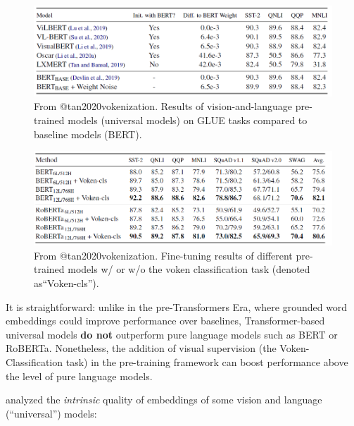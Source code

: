 \documentclass[
]{krantz}
\begin{document}
\begin{figure}

{\centering \includegraphics[width=1\linewidth]{figures/02-03-img-support-text/img-tan2020-02} 

}

\caption{From @tan2020vokenization. Results of vision-and-language pre-trained models (universal models) on GLUE tasks compared to baseline models (BERT).}\label{fig:img-tan2020-02}
\end{figure}

\begin{figure}

{\centering \includegraphics[width=1\linewidth]{figures/02-03-img-support-text/img-tan2020-03} 

}

\caption{From @tan2020vokenization. Fine-tuning results of different pre-trained models w/ or w/o the voken classification task (denoted as“Voken-cls”).}\label{fig:img-tan2020-03}
\end{figure}

It is straightforward: unlike in the pre-Transformers Era, where grounded word embeddings could improve performance over baselines, Transformer-based universal models \textbf{do not} outperform pure language models such as BERT or RoBERTa. Nonetheless, the addition of visual supervision (the Voken-Classification task) in the pre-training framework can boost performance above the level of pure language models.

\citet{pezzelle2021word} analyzed the \emph{intrinsic} quality of embeddings of some vision and language (``universal'') models:
\end{document}
